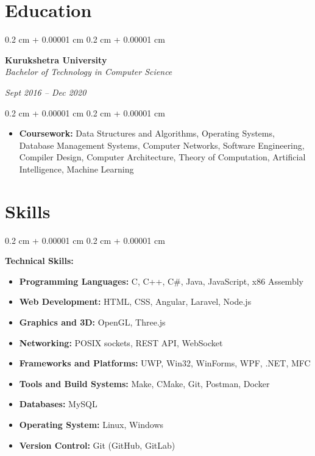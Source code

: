 \documentclass[10pt, letterpaper]{article}
\newenvironment{highlights}{
    \begin{itemize}[
        topsep=0.10 cm,
        parsep=0.10 cm,
        partopsep=0pt,
        itemsep=0pt,
        leftmargin=0.4 cm + 10pt
    ]
}{
    \end{itemize}
} %
\newenvironment{onecolentry}{
    \begin{adjustwidth}{
        0.2 cm + 0.00001 cm
    }{
        0.2 cm + 0.00001 cm
    }
}{
    \end{adjustwidth}
} %
\newenvironment{twocolentry}[2][]{
    \onecolentry
    \def\secondColumn{#2}
    \setcolumnwidth{\fill, 4.5 cm}
    \begin{paracol}{2}
}{
    \switchcolumn \raggedleft \secondColumn
    \end{paracol}
    \endonecolentry
} %
\begin{document}
    \section{Education}

        \begin{twocolentry}{
        \textit{Sept 2016 – Dec 2020}}
            \textbf{Kurukshetra University} \\
            \textit{Bachelor of Technology in Computer Science}
        \end{twocolentry}

        \vspace{0.10 cm}
        \begin{onecolentry}
            \begin{highlights}
                \item \textbf{Coursework:} Data Structures and Algorithms, Operating Systems, Database Management Systems, Computer Networks, Software Engineering, Compiler Design, Computer Architecture, Theory of Computation, Artificial Intelligence, Machine Learning
            \end{highlights}
        \end{onecolentry}

    \section{Skills}

    \begin{onecolentry}
        \textbf{Technical Skills:}
        \begin{itemize}[leftmargin=2em, label={}]
            \item \textbf{Programming Languages:} C, C++, C\#, Java, JavaScript, x86 Assembly
            \item \textbf{Web Development:} HTML, CSS, Angular, Laravel, Node.js
            \item \textbf{Graphics and 3D:} OpenGL, Three.js
            \item \textbf{Networking:} POSIX sockets, REST API, WebSocket
            \item \textbf{Frameworks and Platforms:} UWP, Win32, WinForms, WPF, .NET, MFC
            \item \textbf{Tools and Build Systems:} Make, CMake, Git, Postman, Docker
            \item \textbf{Databases:} MySQL
            \item \textbf{Operating System:} Linux, Windows
            \item \textbf{Version Control:} Git (GitHub, GitLab)
        \end{itemize}
    \end{onecolentry}
\end{document}
